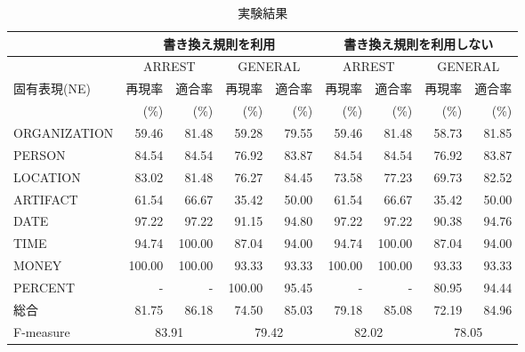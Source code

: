 {\small
\begin{table*}[htbp]
  \begin{center}
    \caption{実験結果}
    \label{Result} 
    \begin{tabular}{|l|r@{ }r|r@{ }r||r@{ }r|r@{ }r|}
      \hline
      & \multicolumn{4}{c||}{書き換え規則を利用} 
      & \multicolumn{4}{c|}{書き換え規則を利用しない} \\
      \hline
      & \multicolumn{2}{c|}{ARREST} 
      & \multicolumn{2}{c||}{GENERAL}
      & \multicolumn{2}{c|}{ARREST} 
      & \multicolumn{2}{c|}{GENERAL}\\
      \cline{2-9}
      固有表現(NE) & \multicolumn{1}{c}{再現率} 
      & \multicolumn{1}{c|}{適合率} & \multicolumn{1}{c}{再現率} 
      & \multicolumn{1}{c||}{適合率} & \multicolumn{1}{c}{再現率} 
      & \multicolumn{1}{c|}{適合率} & \multicolumn{1}{c}{再現率} 
      & \multicolumn{1}{c|}{適合率} \\
      & (\%) & (\%) & (\%) & (\%) & (\%) & (\%) & (\%) & (\%) \\
      \hline      
      ORGANIZATION & 59.46 & 81.48 & 59.28 & 79.55 
      & 59.46 & 81.48 & 58.73 & 81.85 \\
      PERSON       & 84.54 & 84.54 & 76.92 & 83.87 
      & 84.54 & 84.54 & 76.92 & 83.87 \\
      LOCATION     & 83.02 & 81.48 & 76.27 & 84.45
      & 73.58 & 77.23 & 69.73 & 82.52 \\
      ARTIFACT     & 61.54 & 66.67 & 35.42 & 50.00 
      & 61.54 & 66.67 & 35.42 & 50.00 \\
      DATE         & 97.22 & 97.22 & 91.15 & 94.80 
      & 97.22 & 97.22 & 90.38 & 94.76 \\
      TIME         & 94.74 & 100.00 & 87.04 & 94.00 
      & 94.74 & 100.00 & 87.04 & 94.00 \\
      MONEY        & 100.00 & 100.00 & 93.33 & 93.33 
      & 100.00 & 100.00 & 93.33 & 93.33 \\
      PERCENT      & - & - & 100.00 & 95.45
      & - & - & 80.95 & 94.44 \\
      \hline
      総合 & 81.75 & 86.18 & 74.50 & 85.03 & 79.18 & 85.08 & 72.19 & 84.96 \\
      \hline
      \hline
      F-measure & \multicolumn{2}{c|}{83.91} & \multicolumn{2}{c||}{79.42} 
      & \multicolumn{2}{c|}{82.02} & \multicolumn{2}{c|}{78.05} \\
      \hline
    \end{tabular}
  \end{center}
\end{table*}
}

